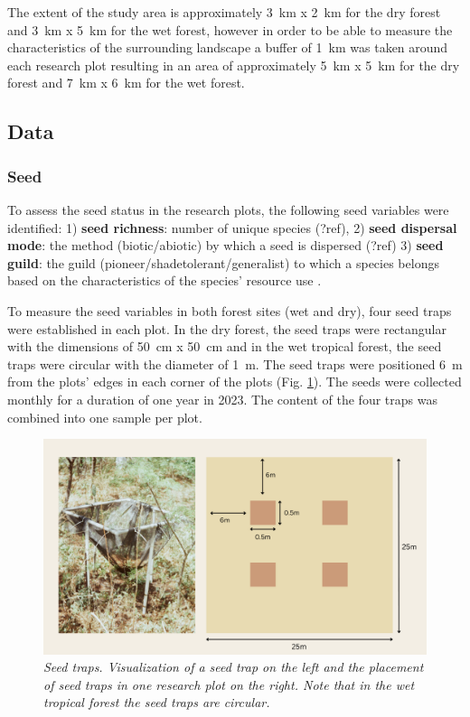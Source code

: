 The extent of the study area is approximately 3~km x 2~km for the dry forest and 3~km x 5~km for the wet forest, however in order to be able to measure the characteristics of the surrounding landscape a buffer of 1~km was taken around each research plot resulting in an area of approximately 5~km x 5~km for the dry forest and 7~km x 6~km for the wet forest.

\subsection{Data}

\subsubsection{Seed}
To assess the seed status in the research plots, the following seed variables were identified: 1) \textbf{seed richness}: number of unique species (?ref), 2) \textbf{seed dispersal mode}: the method (biotic/abiotic) by which a seed is dispersed (?ref)  3) \textbf{seed guild}: the guild (pioneer/shadetolerant/generalist) to which a species belongs based on the characteristics of the species' resource use \citep{blondelGuildsFunctionalGroups2003}. 

To measure the seed variables in both forest sites (wet and dry), four seed traps were established in each plot. In the dry forest, the seed traps were rectangular with the dimensions of 50~cm x 50~cm and in the wet tropical forest, the seed traps were circular with the diameter of 1~m. The seed traps were positioned 6~m from the plots’ edges in each corner of the plots (Fig. \ref{fig:st}). The seeds were collected monthly for a duration of one year in 2023. The content of the four traps was combined into one sample per plot.

\begin{figure}[htbp]
\centering
\includegraphics[width=\linewidth, keepaspectratio]{Report/figures/02_seedtraps.pdf}
\caption{\textit{Seed traps. Visualization of a seed trap on the left and the placement of seed traps in one research plot on the right. Note that in the wet tropical forest the seed traps are circular.}}
\label{fig:st}
\end{figure}

